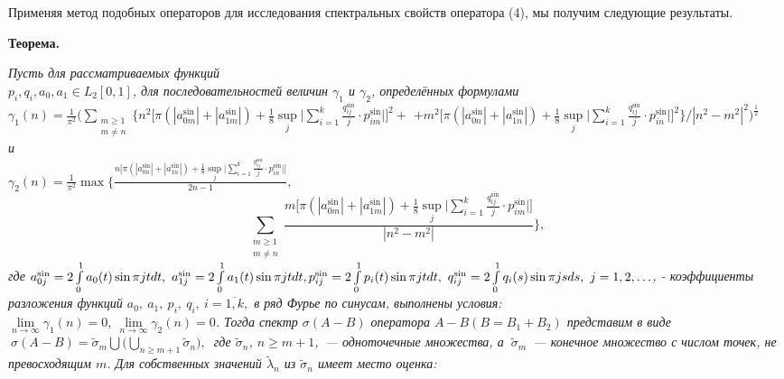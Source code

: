 Применяя метод подобных операторов для исследования спектральных свойств оператора (4), мы получим следующие результаты.

\textbf{Теорема.} {\it Пусть для рассматриваемых функций\\$p_i, q_i, a_0, a_{1}\in{L_{2}[0,1]}$, для последовательностей величин $\gamma_1$ и $\gamma_2$, определённых формулами\\
$\gamma_1(n) = \frac{1}{\pi^2}\bigg(\sum\limits_{\substack{m\geqslant 1 \\ m\ne n}}\bigg\{n^2\bigg[\pi(|a_{0m}^{\sin}|+|a_{1m}^{\sin}|)+
\frac{1}{8}\sup\limits_j\bigg|\sum\limits_{i=1}^{k}{\frac{q_{ij}^{\sin}}{j}\cdot{p_{im}^{\sin}}}\bigg|\bigg]^2 +$
$+ m^2\bigg[\pi(|a_{0n}^{\sin}|+|a_{1n}^{\sin}|)+\frac{1}{8}\sup\limits_j\bigg|\sum\limits_{i=1}^k
\frac{q_{ij}^{\sin}}{j}\cdot{p_{in}^{\sin}}\bigg|\bigg]^2\bigg\}\Bigg/{|n^2-m^2|^2}\bigg)^\frac{1}{2}$\\и\\
$\gamma_2(n)= \frac{1}{\pi^2}\max\bigg\{\frac{n\bigg[\pi(|a_{0n}^{\sin}|+|a_{1n}^{\sin}|)+
\frac{1}{8}\sup\limits_j\bigg|\sum\limits_{i=1}^{k}{\frac{q_{ij}^{\sin}}{j}\cdot{p_{in}^{\sin}}}\bigg|\bigg]}{2n-1},$
$$\sum\limits_{\substack{m\geqslant 1 \\ m\ne n}}\frac{m\bigg[\pi(|a_{0m}^{\sin}|+|a_{1m}^{\sin}|)+
\frac{1}{8}\sup\limits_j\bigg|\sum\limits_{i=1}^{k}{\frac{q_{ij}^{\sin}}{j}\cdot{p_{im}^{\sin}}}\bigg|\bigg]}{|n^2-m^2|}\bigg\},$$
где $a_{0j}^{\sin} = 2\int\limits_0^1{a_0(t)\sin\pi{jt}}dt,~a_{1j}^{\sin} = 2\int\limits_0^1{a_1(t)\sin\pi{jt}}dt,\\p_{ij}^{\sin} = 2\int\limits_0^1{p_i(t)\sin\pi{jt}}dt,~q_{ij}^{\sin} = 2\int\limits_0^1{q_i(s)\sin\pi{js}}ds, ~j= 1, 2, \ldots$, - коэффициенты разложения функций $a_0,~a_1,~p_i,~q_i, ~i=\overline{1, k},$ в ряд Фурье по синусам, выполнены условия:\\$\lim\limits_{n\to\infty}\gamma_1(n)= 0,~\lim\limits_{n\to\infty}\gamma_2(n)=0$.
Тогда спектр $\sigma(A - B)$ оператора $A - B (B = B_1 + B_2)$ представим в виде $~\sigma(A-B)= \widetilde{\sigma}_m\bigcup\bigg(\bigcup\limits_{n\geqslant m+1}\widetilde{\sigma}_n\bigg),~$
где $\widetilde{\sigma}_n$, $n\geqslant m+1$,~--- одноточечные множества, а $~\widetilde{\sigma}_m$~--- конечное множество с числом
точек, не превосходящим $m$. Для собственных значений $\widetilde{\lambda}_n$ из $\widetilde{\sigma}_n$ имеет место оценка:

}

